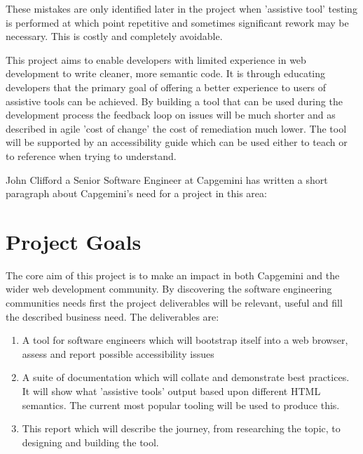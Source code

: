  These mistakes are only identified later in the project when
 'assistive tool' testing is performed at which point repetitive and sometimes
 significant rework may be necessary. This is costly and completely
 avoidable.

 This project aims to enable developers with limited experience in web
 development to write cleaner, more semantic code. It is through educating
 developers that the primary goal of offering a better experience to users of
 assistive tools can be achieved. By building a tool that can be used during
 the development process the feedback loop on issues will be much
 shorter and as described in agile 'cost of change' the cost of remediation
 much lower. The tool will be supported by an accessibility guide which can
 be used either to teach or to reference when trying to understand.

John Clifford a Senior Software Engineer at Capgemini has written a short
paragraph about Capgemini's need for a project in this area:
\begin{quote}
\end{quote}


\section{Project Goals}
The core aim of this project is to make an impact in both Capgemini and the
wider web development community. By discovering the software
engineering communities needs first
the project deliverables will be relevant, useful and fill the described
business need. The deliverables are:
\begin{enumerate}
  \item A tool for software engineers which will bootstrap itself into a web
browser, assess and report possible accessibility issues
  \item A suite of documentation which will collate and demonstrate best
practices. It will show what 'assistive tools' output based upon different
HTML semantics. The current most popular tooling will be used to produce this.
  \item This report which will describe the journey, from researching the
topic, to designing and building the tool.
\end{enumerate}

